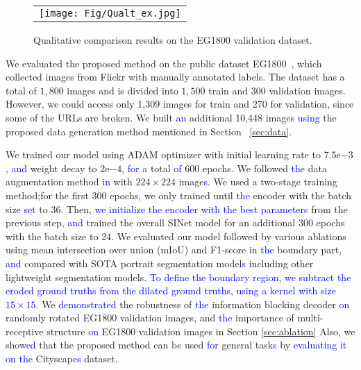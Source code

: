 \documentclass[10pt,twocolumn,letterpaper]{article}
\newcommand\Lars[1]{\textcolor{blue}{#1}}
\newcommand\Lars[1]{#1}
\begin{document}
\begin{figure*}[t]
\begin{center}
\begin{tabular}{c}
    \texttt{[image: Fig/Qualt\_ex.jpg]}  \\ 
        \end{tabular}\end{center}
\vspace{-4mm}
   \caption{Qualitative comparison results on the EG1800 validation dataset.}
\label{fig:ex}
\end{figure*}


We evaluated the proposed method on the public dataset EG1800~\cite{shen2016automatic}, which collected images from Flickr with manually annotated labels.
The dataset has a total of $1,800$ images and is divided into $1,500$ train and $300$ validation images.
However, we could access only 1,309 images for train and 270 for validation, since some of the URLs are broken. 
We built \Lars{an} additional 10,448 images \Lars{using} the proposed data generation method mentioned in Section ~\ref{sec:data}.

We trained our model using ADAM optimizer with initial learning rate to $7.5\mathrm{e}{-3}$, \Lars{and} weight decay to $2\mathrm{e}{-4}$, \Lars{for a} total \Lars{of} 600 epochs.
We followed \Lars{the} data augmentation method \Lars{in} \cite{zhang2019portraitnet} with $224 \times 224$ image\Lars{s}.
We used a two-stage training method;for the first 300 epochs, we only trained until \Lars{the} encoder with the batch size \Lars{set} to $36$.
Then, \Lars{we initialize the encoder with the best parameters }from the previous step, \Lars{and} trained the overall SINet model for an additional 300 epochs with the batch size to $24$.
We evaluated our model followed by various ablations using mean intersection over union (mIoU) and F1-score in \Lars{the} boundary part, \Lars{and} compared with SOTA portrait segmentation model\Lars{s} including other lightweight segmentation models.
\Lars{To define the boundary region, we subtract the eroded ground truths from the dilated ground truths, using a kernel with size $15\times15$. } 
We \Lars{demonstrated} the robustness of \Lars{the} information blocking decoder \Lars{on} randomly rotated EG1800 validation images, and \Lars{the} importance of multi-receptive structure \Lars{on} EG1800 validation images in Section \ref{sec:ablation}
Also, we show\Lars{ed} that the proposed method can be used \Lars{for} general task\Lars{s} by \Lars{evaluating it on the} Cityscape\Lars{s} dataset.
\end{document}
